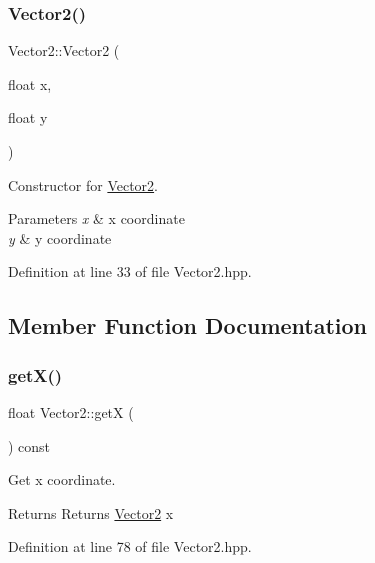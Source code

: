 \subsubsection{\texorpdfstring{Vector2()}{Vector2()}}
{\footnotesize\ttfamily Vector2\+::\+Vector2 (\begin{DoxyParamCaption}\item[{float}]{x,  }\item[{float}]{y }\end{DoxyParamCaption})\hspace{0.3cm}{\ttfamily [inline]}}



Constructor for \mbox{\hyperlink{classVector2}{Vector2}}. 


\begin{DoxyParams}{Parameters}
{\em x} & x coordinate \\
\hline
{\em y} & y coordinate \\
\hline
\end{DoxyParams}


Definition at line 33 of file Vector2.\+hpp.



\subsection{Member Function Documentation}
\mbox{\label{classVector2_a808d02062efcc0c016491c04845e3e34}} 
\subsubsection{\texorpdfstring{get\+X()}{getX()}}
{\footnotesize\ttfamily float Vector2\+::getX (\begin{DoxyParamCaption}{ }\end{DoxyParamCaption}) const\hspace{0.3cm}{\ttfamily [inline]}}



Get x coordinate. 

\begin{DoxyReturn}{Returns}
Returns \mbox{\hyperlink{classVector2}{Vector2}} x 
\end{DoxyReturn}


Definition at line 78 of file Vector2.\+hpp.

\mbox{\label{classVector2_a59bf838c0fc50305975e1679509fda83}} 
